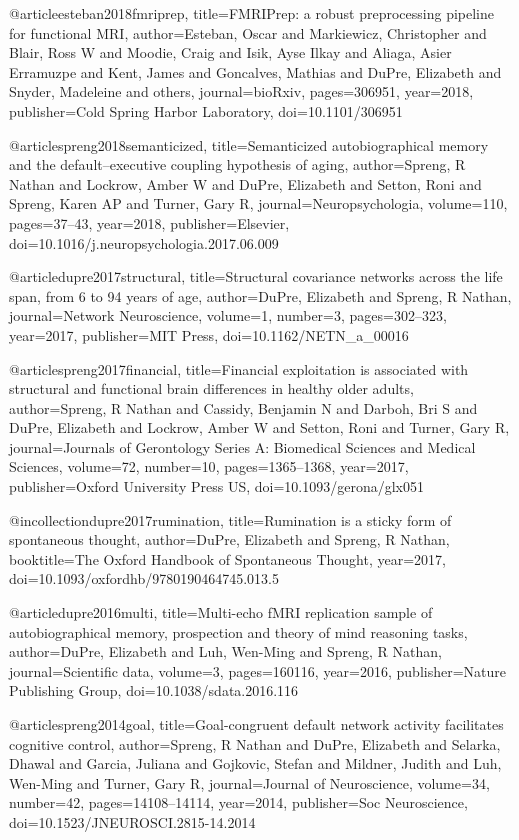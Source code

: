 @article{esteban2018fmriprep,
  title={FMRIPrep: a robust preprocessing pipeline for functional MRI},
  author={Esteban, Oscar and Markiewicz, Christopher and Blair, Ross W and Moodie, Craig and Isik, Ayse Ilkay and Aliaga, Asier Erramuzpe and Kent, James and Goncalves, Mathias and DuPre, Elizabeth and Snyder, Madeleine and others},
  journal={bioRxiv},
  pages={306951},
  year={2018},
  publisher={Cold Spring Harbor Laboratory},
  doi={10.1101/306951}
}

@article{spreng2018semanticized,
  title={Semanticized autobiographical memory and the default--executive coupling hypothesis of aging},
  author={Spreng, R Nathan and Lockrow, Amber W and DuPre, Elizabeth and Setton, Roni and Spreng, Karen AP and Turner, Gary R},
  journal={Neuropsychologia},
  volume={110},
  pages={37--43},
  year={2018},
  publisher={Elsevier},
  doi={10.1016/j.neuropsychologia.2017.06.009}
}

@article{dupre2017structural,
  title={Structural covariance networks across the life span, from 6 to 94 years of age},
  author={DuPre, Elizabeth and Spreng, R Nathan},
  journal={Network Neuroscience},
  volume={1},
  number={3},
  pages={302--323},
  year={2017},
  publisher={MIT Press},
  doi={10.1162/NETN_a_00016}
}

@article{spreng2017financial,
  title={Financial exploitation is associated with structural and functional brain differences in healthy older adults},
  author={Spreng, R Nathan and Cassidy, Benjamin N and Darboh, Bri S and DuPre, Elizabeth and Lockrow, Amber W and Setton, Roni and Turner, Gary R},
  journal={Journals of Gerontology Series A: Biomedical Sciences and Medical Sciences},
  volume={72},
  number={10},
  pages={1365--1368},
  year={2017},
  publisher={Oxford University Press US},
  doi={10.1093/gerona/glx051}
}

@incollection{dupre2017rumination,
  title={Rumination is a sticky form of spontaneous thought},
  author={DuPre, Elizabeth and Spreng, R Nathan},
  booktitle={The Oxford Handbook of Spontaneous Thought},
  year={2017},
  doi={10.1093/oxfordhb/9780190464745.013.5}
}

@article{dupre2016multi,
  title={Multi-echo fMRI replication sample of autobiographical memory, prospection and theory of mind reasoning tasks},
  author={DuPre, Elizabeth and Luh, Wen-Ming and Spreng, R Nathan},
  journal={Scientific data},
  volume={3},
  pages={160116},
  year={2016},
  publisher={Nature Publishing Group},
  doi={10.1038/sdata.2016.116}
}

@article{spreng2014goal,
  title={Goal-congruent default network activity facilitates cognitive control},
  author={Spreng, R Nathan and DuPre, Elizabeth and Selarka, Dhawal and Garcia, Juliana and Gojkovic, Stefan and Mildner, Judith and Luh, Wen-Ming and Turner, Gary R},
  journal={Journal of Neuroscience},
  volume={34},
  number={42},
  pages={14108--14114},
  year={2014},
  publisher={Soc Neuroscience},
  doi={10.1523/JNEUROSCI.2815-14.2014}
}
